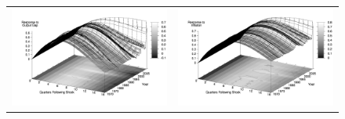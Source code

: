 \documentclass[12pt]{article}
\begin{document}
{\begin{figure}
\begin{tabular}{cc}
\includegraphics[scale=0.12]{images/Irf16_Output_Gap_Inflation_Judgment_Shock.png} & \includegraphics[scale=0.12]{images/Irf16_Inflation_Inflation_Judgment_Shock.png} \\
\end{tabular}
\end{figure}

}
\end{document}
